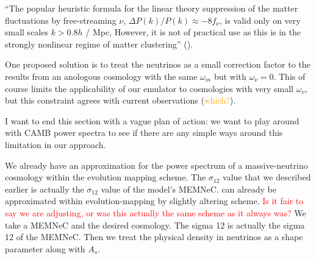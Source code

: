 ``The popular heuristic formula for the linear theory suppression of the matter
fluctuations by free-streaming $\nu$, $\Delta P(k) / P(k) \approx -8 f_\nu$, is
valid only on very small scales $k > 0.8 h$ / Mpc, However, it is not of
practical use as this is in the strongly nonlinear regime of matter
clustering'' ().

One proposed solution is to treat the neutrinos as a small correction factor
to the results from an anologous cosmology with the same $\omega_m$ but with
$\omega_\nu = 0$. This of course limits the applicability of our emulator to
cosmologies with very small $\omega_\nu$, but this constraint agrees with
current observations (\textcolor{orange}{which?}).

I want to end this section with a vague plan of action: we want to play around with CAMB power spectra to see if there are any simple ways around this limitation in our approach.



We already have an approximation for the power spectrum of a massive-neutrino cosmology within the evolution mapping scheme. The $\sigma_{12}$ value that we described earlier is actually the $\sigma_{12}$ value of the model's MEMNeC. can already be approximated within evolution-mapping by slightly altering scheme. \textcolor{red}{Is it fair to say we are adjusting, or was this actually the same scheme as it always was?} We take a MEMNeC and the desired cosmology. The sigma 12 is actually the sigma 12 of the MEMNeC. Then we treat the physical density in neutrinos as a shape parameter along with $A_s$.
